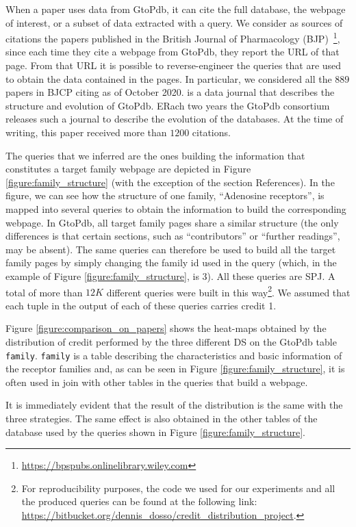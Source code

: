 When a paper uses data from GtoPdb, it can cite the full database, the webpage of interest, or a subset of data extracted with a query. 
We consider as sources of citations the papers published in the British Journal of Pharmacology (BJP)~\footnote{\url{https://bpspubs.onlinelibrary.wiley.com}}, since each time they cite a webpage from GtoPdb, they report the URL of that page. From that URL it is possible to reverse-engineer the queries that are used to obtain the data contained in the pages. 
In particular, we considered all the $889$ papers in BJCP citing \citep{iuphar2018} as of October 2020. \citep{iuphar2018} is a data journal that describes the structure and evolution of GtoPdb. ERach two years the GtoPdb consortium releases such a journal to describe the evolution of the databases.
At the time of writing, this paper received more than $1200$ citations. 

The queries that we inferred are the ones building the information that constitutes a target family webpage are depicted in Figure \ref{figure:family_structure} (with the exception of the section References). 
In the figure, we can see how the structure of one family, ``Adenosine receptors'', is mapped into several queries to obtain the information to build the corresponding webpage. 
In GtoPdb, all target family pages share a similar structure (the only differences is that certain sections, such as ``contributors'' or ``further readings'', may be absent).
The same queries can therefore be used to build all the target family pages by simply changing the family id used in the query (which, in the example of Figure \ref{figure:family_structure}, is 3). All these queries are SPJ. 
A total of more than $12K$ different queries were built in this way\footnote{For reproducibility purposes, the code we used for our experiments and all the produced queries can be found at the following link: \url{https://bitbucket.org/dennis_dosso/credit_distribution_project}.}.
We assumed that each tuple in the output of each of these queries carries credit 1.

Figure \ref{figure:comparison_on_papers} shows the heat-maps obtained by the distribution of credit performed by the three different DS on the GtoPdb table \texttt{family}.
\texttt{family} is a table describing the characteristics and basic information of the receptor families and, as can be seen in Figure \ref{figure:family_structure}, it is often used in join with other tables in the queries that build a webpage.

It is immediately evident that the result of the distribution is the same with the three strategies. The same effect is also obtained in the other tables of the database used by the queries shown in Figure \ref{figure:family_structure}. 


